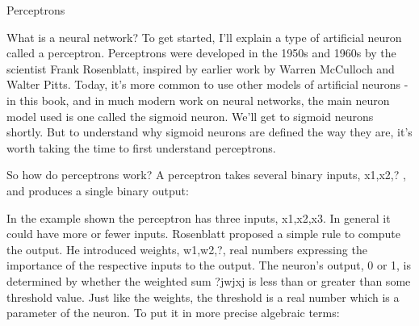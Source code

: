 Perceptrons

What is a neural network? To get started, I'll explain a type of artificial neuron called a perceptron. Perceptrons were developed in the 1950s and 1960s by the scientist Frank Rosenblatt, inspired by earlier work by Warren McCulloch and Walter Pitts. Today, it's more common to use other models of artificial neurons - in this book, and in much modern work on neural networks, the main neuron model used is one called the sigmoid neuron. We'll get to sigmoid neurons shortly. But to understand why sigmoid neurons are defined the way they are, it's worth taking the time to first understand perceptrons.

So how do perceptrons work? A perceptron takes several binary inputs, x1,x2,? , and produces a single binary output: 

In the example shown the perceptron has three inputs, x1,x2,x3. In general it could have more or fewer inputs. Rosenblatt proposed a simple rule to compute the output. He introduced weights, w1,w2,?, real numbers expressing the importance of the respective inputs to the output. The neuron's output, 0 or 1, is determined by whether the weighted sum ?jwjxj is less than or greater than some threshold value. Just like the weights, the threshold is a real number which is a parameter of the neuron. To put it in more precise algebraic terms: 


